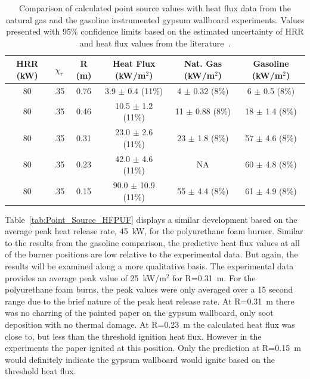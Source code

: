 \documentclass[twoside]{uocthesis}
\begin{document}
{\begin{table}
	\centering
	\footnotesize
	\begin{tabular}{|c|c|c|c|c|c|}
	\hline
		HRR (kW) &   $\chi_r$   & R (m)	 & Heat Flux (kW/m$^2$)     &  Nat. Gas (kW/m$^2$)      & Gasoline (kW/m$^2$) 	\\ \hline 
		80    &   .35 		& 0.76 	     & 3.9 $\pm$ 0.4 (11\%) 	&  4 $\pm$ 0.32 (8\%) 	 	   & 6 $\pm$ 0.5 (8\%)     \\
		80    &   .35    	& 0.46	     & 10.5 $\pm$ 1.2 (11\%) 	&  11 $\pm$ 0.88 (8\%)  	   & 18 $\pm$ 1.4 (8\%)    \\
		80    &   .35 		& 0.31	     & 23.0 $\pm$ 2.6 (11\%) 	&  23 $\pm$ 1.8 (8\%)  	   & 57 $\pm$ 4.6 (8\%)     \\
        80    &   .35 		& 0.23	     & 42.0 $\pm$ 4.6 (11\%) 	&  NA 					  	   & 60 $\pm$ 4.8 (8\%)     \\
        80    &   .35 		& 0.15	     & 90.0 $\pm$ 10.9 (11\%) 	&  55 $\pm$ 4.4 (8\%)  	   & 61 $\pm$ 4.9 (8\%)     \\
	\hline
	\end{tabular}
	\caption[Comparison of calculated point source values (HRR = 80~kW) with heat flux data from the instrumented gypsum wallboard experiments.]{Comparison of calculated point source values with heat flux data from the natural gas and the gasoline instrumented gypsum wallboard experiments. Values presented with 95\% confidence limits based on the estimated uncertainty of HRR and heat flux values from the literature~\cite{Bryant:2003,Pitts:2006}.}
	\label{tab:Point_Source_HFNGG}
\end{table} 

Table~\ref{tab:Point_Source_HFPUF} displays a similar development based on the average peak heat release rate, 45~kW, for the polyurethane foam burner.
Similar to the results from the gasoline comparison, the predictive heat flux values at all of the burner positions are low relative to the experimental data.  But again, the results will be examined along a more qualitative basis. The experimental data provides an average peak value of 25~kW/m$^2$ for R=0.31~m. For the polyurethane foam burns, the peak values were only averaged over a 15 second range due to the brief nature of the peak heat release rate. At R=0.31~m there was no charring of the painted paper on the gypsum wallboard, only soot deposition with no thermal damage.  At R=0.23~m the calculated heat flux was close to, but less than the threshold ignition heat flux.  However in the experiments the paper ignited at this position.  Only the prediction at R=0.15~m would definitely indicate the gypsum wallboard would ignite based on the threshold heat flux.           

}
\end{document}
